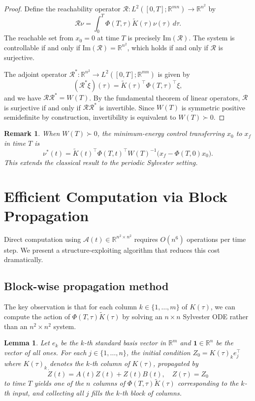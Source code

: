\documentclass[5p,times]{elsarticle} %
\newtheorem{remark}{Remark}
\newtheorem{lemma}{Lemma}
\newcommand{\Ktil}{\widetilde{K}}
\newcommand{\Acal}{\mathcal{A}}
\newcommand{\ones}{\mathbf{1}}
\begin{document}
\begin{proof}
Define the reachability operator \(\mathcal{R}:L^2([0,T];\mathbb{R}^{mn})\to\mathbb{R}^{n^2}\) by
\[
\mathcal{R}\nu=\int_0^T\Phi(T,\tau)\Ktil(\tau)\nu(\tau)\,d\tau.
\]
The reachable set from \(x_0=0\) at time \(T\) is precisely \(\text{Im}(\mathcal{R})\). The system is controllable if and only if \(\text{Im}(\mathcal{R})=\mathbb{R}^{n^2}\), which holds if and only if \(\mathcal{R}\) is surjective.

The adjoint operator \(\mathcal{R}^*:\mathbb{R}^{n^2}\to L^2([0,T];\mathbb{R}^{mn})\) is given by
\[
(\mathcal{R}^*\xi)(\tau)=\Ktil(\tau)^\top\Phi(T,\tau)^\top\xi,
\]
and we have \(\mathcal{R}\mathcal{R}^*=W(T)\). By the fundamental theorem of linear operators, \(\mathcal{R}\) is surjective if and only if \(\mathcal{R}\mathcal{R}^*\) is invertible. Since \(W(T)\) is symmetric positive semidefinite by construction, invertibility is equivalent to \(W(T)\succ 0\).
\end{proof}

\begin{remark}
When \(W(T)\succ 0\), the minimum-energy control transferring \(x_0\) to \(x_f\) in time \(T\) is
\begin{equation}\label{eq:min_energy}
\nu^*(t)=\Ktil(t)^\top\Phi(T,t)^\top W(T)^{-1}\big(x_f-\Phi(T,0)x_0\big).
\end{equation}
This extends the classical result to the periodic Sylvester setting.
\end{remark}

\section{Efficient Computation via Block Propagation}
Direct computation using \(\Acal(t)\in\mathbb{R}^{n^2\times n^2}\) requires \(O(n^6)\) operations per time step. We present a structure-exploiting algorithm that reduces this cost dramatically.

\subsection{Block-wise propagation method}
The key observation is that for each column \(k\in\{1,\ldots,m\}\) of \(K(\tau)\), we can compute the action of \(\Phi(T,\tau)\Ktil(\tau)\) by solving an \(n\times n\) Sylvester ODE rather than an \(n^2\times n^2\) system.

\begin{lemma}
Let \(e_k\) be the \(k\)-th standard basis vector in \(\mathbb{R}^m\) and \(\ones\in\mathbb{R}^n\) be the vector of all ones. For each \(j\in\{1,\ldots,n\}\), the initial condition \(Z_0=K(\tau)_k e_j^\top\) where \(K(\tau)_k\) denotes the \(k\)-th column of \(K(\tau)\), propagated by
\[
\dot Z(t)=A(t)Z(t)+Z(t)B(t),\quad Z(\tau)=Z_0
\]
to time \(T\) yields one of the \(n\) columns of \(\Phi(T,\tau)\Ktil(\tau)\) corresponding to the \(k\)-th input, and collecting all \(j\) fills the \(k\)-th block of columns.
\end{lemma}
\end{document}
